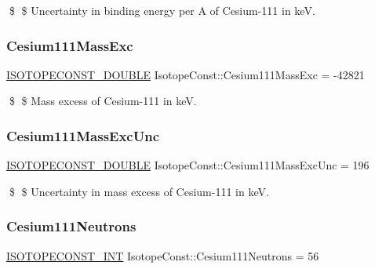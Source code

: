 \$ \$ Uncertainty in binding energy per A of Cesium-\/111 in keV. \mbox{\label{group___isotope_const-_cesium-_cs111_gacf30156b38e465a3b9ea9bcf303f560d}} 
\subsubsection{\texorpdfstring{Cesium111\+Mass\+Exc}{Cesium111MassExc}}
{\footnotesize\ttfamily \mbox{\hyperlink{group___isotope_const-_macros_ga8f45a7272ce02c0b4c65c44636ed719a}{I\+S\+O\+T\+O\+P\+E\+C\+O\+N\+S\+T\+\_\+\+D\+O\+U\+B\+LE}} Isotope\+Const\+::\+Cesium111\+Mass\+Exc = -\/42821}

\$ \$ Mass excess of Cesium-\/111 in keV. \mbox{\label{group___isotope_const-_cesium-_cs111_ga65354649277f3979260923d87f8c39cc}} 
\subsubsection{\texorpdfstring{Cesium111\+Mass\+Exc\+Unc}{Cesium111MassExcUnc}}
{\footnotesize\ttfamily \mbox{\hyperlink{group___isotope_const-_macros_ga8f45a7272ce02c0b4c65c44636ed719a}{I\+S\+O\+T\+O\+P\+E\+C\+O\+N\+S\+T\+\_\+\+D\+O\+U\+B\+LE}} Isotope\+Const\+::\+Cesium111\+Mass\+Exc\+Unc = 196}

\$ \$ Uncertainty in mass excess of Cesium-\/111 in keV. \mbox{\label{group___isotope_const-_cesium-_cs111_ga6928386daeb74ffafae24bc15bba2019}} 
\subsubsection{\texorpdfstring{Cesium111\+Neutrons}{Cesium111Neutrons}}
{\footnotesize\ttfamily \mbox{\hyperlink{group___isotope_const-_macros_ga5f18360b3e99483a35c32d789e62621c}{I\+S\+O\+T\+O\+P\+E\+C\+O\+N\+S\+T\+\_\+\+I\+NT}} Isotope\+Const\+::\+Cesium111\+Neutrons = 56}

